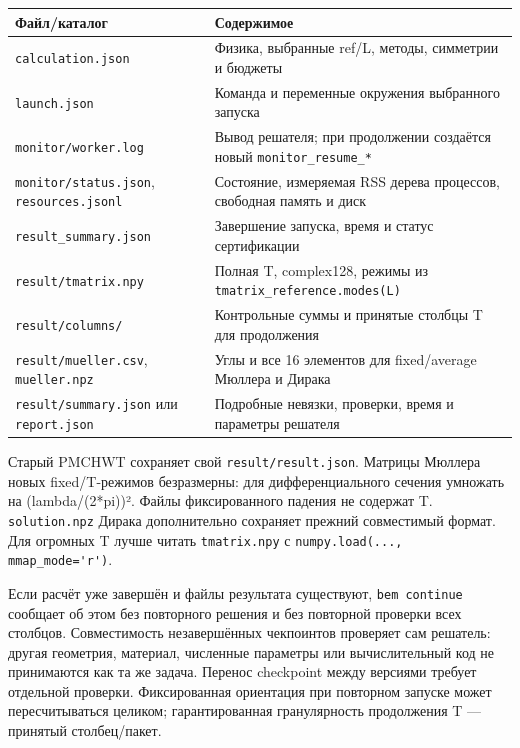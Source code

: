 \documentclass[
  russian,
  11pt,
  a4paper,
]{report}
\newcounter{none} %
\begin{document}
{\def\LTcaptype{none} %
\begin{longtable}[]{@{}
  >{\raggedright\arraybackslash}p{}
  >{\raggedright\arraybackslash}p{}@{}}
\toprule\noalign{}
\begin{minipage}[b]{\linewidth}\raggedright
Файл/каталог
\end{minipage} & \begin{minipage}[b]{\linewidth}\raggedright
Содержимое
\end{minipage} \\
\midrule\noalign{}
\endhead
\bottomrule\noalign{}
\endlastfoot
\nolinkurl{calculation.json} & Физика, выбранные ref/L, методы,
симметрии и бюджеты \\
\nolinkurl{launch.json} & Команда и переменные окружения выбранного
запуска \\
\nolinkurl{monitor/worker.log} & Вывод решателя; при продолжении
создаётся новый \nolinkurl{monitor_resume_*} \\
\nolinkurl{monitor/status.json}, \nolinkurl{resources.jsonl} &
Состояние, измеряемая RSS дерева процессов, свободная память и диск \\
\nolinkurl{result_summary.json} & Завершение запуска, время и статус
сертификации \\
\nolinkurl{result/tmatrix.npy} & Полная T, complex128, режимы из
\nolinkurl{tmatrix_reference.modes(L)} \\
\nolinkurl{result/columns/} & Контрольные суммы и принятые столбцы T для
продолжения \\
\nolinkurl{result/mueller.csv}, \nolinkurl{mueller.npz} & Углы и все 16
элементов для fixed/average Мюллера и Дирака \\
\nolinkurl{result/summary.json} или \nolinkurl{report.json} & Подробные
невязки, проверки, время и параметры решателя \\
\end{longtable}
}

Старый PMCHWT сохраняет свой \nolinkurl{result/result.json}. Матрицы
Мюллера новых fixed/T-режимов безразмерны: для дифференциального сечения
умножать на (lambda/(2*pi))². Файлы фиксированного падения не содержат
T. \nolinkurl{solution.npz} Дирака дополнительно сохраняет прежний
совместимый формат. Для огромных T лучше читать \nolinkurl{tmatrix.npy}
с \nolinkurl{numpy.load(..., mmap_mode='r')}.

Если расчёт уже завершён и файлы результата существуют,
\nolinkurl{bem continue} сообщает об этом без повторного решения и без
повторной проверки всех столбцов. Совместимость незавершённых чекпоинтов
проверяет сам решатель: другая геометрия, материал, численные параметры
или вычислительный код не принимаются как та же задача. Перенос
checkpoint между версиями требует отдельной проверки. Фиксированная
ориентация при повторном запуске может пересчитываться целиком;
гарантированная гранулярность продолжения T --- принятый столбец/пакет.
\end{document}
